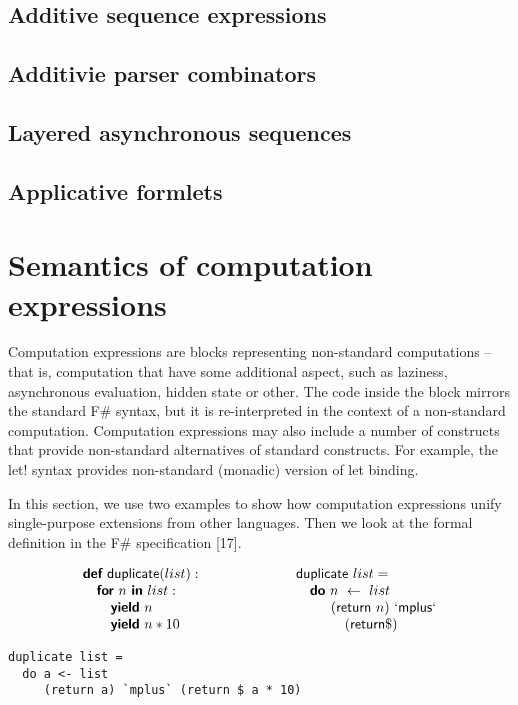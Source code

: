 \documentclass[runningheads,a4paper]{llncs}
\begin{document}
\subsection{Additive sequence expressions}
\label{sec:intro-seq}

\subsection{Additivie parser combinators}
\label{sec:intro-parsers}

\subsection{Layered asynchronous sequences}
\label{sec:intro-asyncseq}

\subsection{Applicative formlets}
\label{sec:intro-formlets}

\section{Semantics of computation expressions}
\label{sec:semantics}

Computation expressions are blocks representing non-standard computations – that is, computation 
that have some additional aspect, such as laziness, asynchronous evaluation, hidden state or other. 
The code inside the block mirrors the standard F\# syntax, but it is re-interpreted in the context of 
a non-standard computation. Computation expressions may also include a number of constructs that 
provide non-standard alternatives of standard constructs. For example, the let! syntax provides 
non-standard (monadic) version of let binding. 

In this section, we use two examples to show how computation expressions unify single-purpose extensions 
from other languages. Then we look at the formal definition in the F\# specification [17].


\begin{equation*}
\begin{array}{lcl}
\textnormal{\bfseries\sffamily def}~\textnormal{\sffamily duplicate}(list): &\hspace{5em}&\textnormal{\sffamily duplicate}~list =\\
\quad \textnormal{\bfseries\sffamily for}~n~\textnormal{\bfseries\sffamily in}~list:               &&\quad \textnormal{\bfseries\sffamily do}~n~\leftarrow~list\\
\quad\quad \textnormal{\bfseries\sffamily yield}~n                       &&\quad \quad~\, (\textnormal{\sffamily return}~n)~`\textnormal{\sffamily mplus}`\\
\quad\quad \textnormal{\bfseries\sffamily yield}~n*10                    &&\quad \quad\quad~\, (\textnormal{\sffamily return} \$)\\
\end{array}
\end{equation*}
\begin{verbatim}
duplicate list = 
  do a <- list
     (return a) `mplus` (return $ a * 10)
\end{verbatim}
\end{document}
